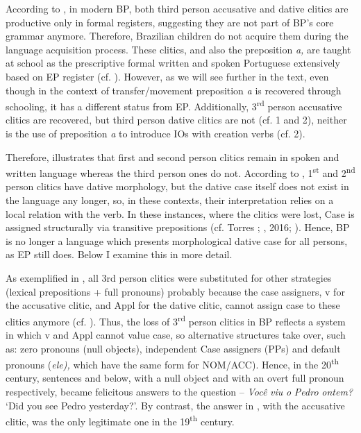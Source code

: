 \documentclass[output=paper,modfonts,nonflat]{langsci/langscibook}
\begin{document}
According to \citet{Kato2005}, in modern BP, both third person accusative and dative clitics are productive only in formal registers, suggesting they are not part of BP’s core grammar anymore. Therefore, Brazilian children do not acquire them during the language acquisition process. These clitics, and also the preposition \textit{a,} are taught at school as the prescriptive formal written and spoken Portuguese extensively based on EP register (cf. \citealt{KatoEtAl2009}). However, as we will see further in the text, even though in the context of transfer/movement preposition \textit{a} is recovered through schooling, it has a different status from EP. Additionally, 3\textsuperscript{rd} person accusative clitics are recovered, but third person dative clitics are not (cf. 1 and 2), neither is the use of preposition \textit{a} to introduce IOs with creation verbs (cf. 2).

Therefore,  illustrates that first and second person clitics remain in spoken and written language whereas the third person ones do not. According to \citet{Galves2018}, 1\textsuperscript{st} and 2\textsuperscript{nd} person clitics have dative morphology, but the dative case itself does not exist in the language any longer, so, in these contexts, their interpretation relies on a local relation with the verb. In these instances, where the clitics were lost, Case is assigned structurally via transitive prepositions (cf. Torres \citealt{MoraisSalles2010}; \citealt{Calindro2015}, 2016; \citealt{CarvalhoCalindro2018}). Hence, BP is no longer a language which presents morphological dative case for all persons, as EP still does. Below I examine this in more detail.

As exemplified in , all 3rd person clitics were substituted for other strategies (lexical prepositions + full pronouns) probably because the case assigners, v for the accusative clitic, and Appl for the dative clitic, cannot assign case to these clitics anymore (cf. \citealt{CarvalhoCalindro2018}). Thus, the loss of 3\textsuperscript{rd} person clitics in BP reflects a system in which v and Appl cannot value case, so alternative structures take over, such as: zero pronouns (null objects), independent Case assigners (PPs) and default pronouns (\textit{ele),} which have the same form for NOM/ACC). Hence, in the 20\textsuperscript{th} century, sentences  and  below, with a null object and with an overt full pronoun respectively, became felicitous answers to the question – \textit{Você} \textit{viu} \textit{o} \textit{Pedro} \textit{ontem?} ‘Did you see Pedro yesterday?’. By contrast, the answer in , with the accusative clitic, was the only legitimate one in the 19\textsuperscript{th} century.
\end{document}

